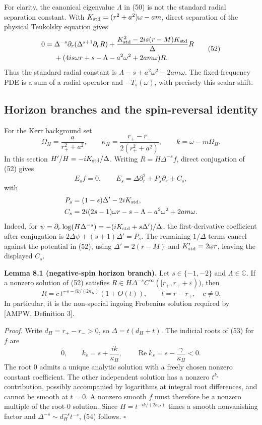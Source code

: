\documentclass[
  10pt,
  a4paper,
]{article}
\begin{document}
For clarity, the canonical eigenvalue \(\Lambda\) in (50) is not the
standard radial separation constant. With
\(K_{\rm std}=(r^2+a^2)\omega-am\), direct separation of the physical
Teukolsky equation gives \[
\begin{split}
0={}&\Delta^{-s}\partial_r(\Delta^{s+1}\partial_r R)
 +\frac{K_{\rm std}^2-2is(r-M)K_{\rm std}}{\Delta}R\\
 &+(4is\omega r+s-\Lambda-a^2\omega^2+2am\omega)R .
\end{split}
 \tag{52}
\] Thus the standard radial constant is
\(\Lambda-s+a^2\omega^2-2am\omega\). The fixed-frequency PDE is a sum of
a radial operator and \(-T_s(\omega)\), with precisely this scalar
shift.

\subsection{Horizon branches and the spin-reversal
identity}\label{horizon-branches-and-the-spin-reversal-identity}

For the Kerr background set \[
 \Omega_H=\frac{a}{r_+^2+a^2},\qquad
 \kappa_H=\frac{r_+-r_-}{2(r_+^2+a^2)},\qquad
 k=\omega-m\Omega_H.
\] In this section \(H'/H=-iK_{\rm std}/\Delta\). Writing
\(R=H\Delta^{-s}f\), direct conjugation of (52) gives \[
 E_sf=0,\qquad E_s=\Delta\partial_r^2+P_s\partial_r+C_s,
 \tag{53}
\] with \[
 \begin{aligned}
 P_s&=(1-s)\Delta'-2iK_{\rm std},\\
 C_s&=2i(2s-1)\omega r-s-\Lambda-a^2\omega^2+2am\omega .
 \end{aligned}
\] Indeed, for \(\psi=\partial_r\log(H\Delta^{-s})
=-(iK_{\rm std}+s\Delta')/\Delta\), the first-derivative coefficient
after conjugation is \(2\Delta\psi+(s+1)\Delta'=P_s\). The remaining
\(1/\Delta\) terms cancel against the potential in (52), using
\(\Delta'=2(r-M)\) and \(K_{\rm std}'=2\omega r\), leaving the displayed
\(C_s\).

\textbf{Lemma 8.1 (negative-spin horizon branch).} Let \(s\in\{-1,-2\}\)
and \(\Lambda\in\mathbb C\). If a nonzero solution of (52) satisfies
\(R\in H\Delta^{-s}C^\infty([r_+,r_++\varepsilon))\), then \[
 R=c\,t^{-s-ik/(2\kappa_H)}(1+O(t)),\qquad
 t=r-r_+,\quad c\ne0.
 \tag{54}
\] In particular, it is the non-special ingoing Frobenius solution
required by {[}AMPW, Definition 3{]}.

\emph{Proof.} Write \(d_H=r_+-r_->0\), so \(\Delta=t(d_H+t)\). The
indicial roots of (53) for \(f\) are \[
 0,\qquad k_s=s+\frac{ik}{\kappa_H},\qquad
 \operatorname{Re}k_s=s-\frac{\gamma}{\kappa_H}<0.
\] The root \(0\) admits a unique analytic solution with a freely chosen
nonzero constant coefficient. The other independent solution has a
nonzero \(t^{k_s}\) contribution, possibly accompanied by logarithms at
integral root differences, and cannot be smooth at \(t=0\). A nonzero
smooth \(f\) must therefore be a nonzero multiple of the root-\(0\)
solution. Since \(H=t^{-ik/(2\kappa_H)}\) times a smooth nonvanishing
factor and \(\Delta^{-s}\sim d_H^{-s}t^{-s}\), (54) follows. \(\square\)
\end{document}
